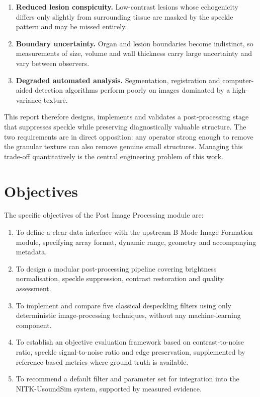 \documentclass[12pt,a4paper,oneside]{report}
\begin{document}
\begin{enumerate}[leftmargin=*,itemsep=2pt]
\item \textbf{Reduced lesion conspicuity.} Low-contrast lesions whose echogenicity
      differs only slightly from surrounding tissue are masked by the speckle
      pattern and may be missed entirely.
\item \textbf{Boundary uncertainty.} Organ and lesion boundaries become
      indistinct, so measurements of size, volume and wall thickness carry large
      uncertainty and vary between observers.
\item \textbf{Degraded automated analysis.} Segmentation, registration and
      computer-aided detection algorithms perform poorly on images dominated by a
      high-variance texture.
\end{enumerate}

This report therefore designs, implements and validates a post-processing stage
that suppresses speckle while preserving diagnostically valuable structure. The
two requirements are in direct opposition: any operator strong enough to remove
the granular texture can also remove genuine small structures. Managing this
trade-off quantitatively is the central engineering problem of this work.

\section{Objectives}

The specific objectives of the Post Image Processing module are:

\begin{enumerate}[leftmargin=*,itemsep=2pt]
\item To define a clear data interface with the upstream B-Mode Image Formation
      module, specifying array format, dynamic range, geometry and accompanying
      metadata.
\item To design a modular post-processing pipeline covering brightness
      normalisation, speckle suppression, contrast restoration and quality
      assessment.
\item To implement and compare five classical despeckling filters using only
      deterministic image-processing techniques, without any machine-learning
      component.
\item To establish an objective evaluation framework based on contrast-to-noise
      ratio, speckle signal-to-noise ratio and edge preservation, supplemented by
      reference-based metrics where ground truth is available.
\item To recommend a default filter and parameter set for integration into the
      NITK-UsoundSim system, supported by measured evidence.
\end{enumerate}
\end{document}

